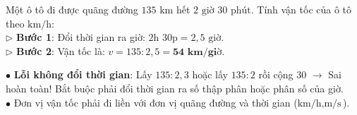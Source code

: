 \documentclass[14pt,a4paper,oneside]{extbook}
\begin{document}
\vspace{3mm}

\noindent
\begin{minipage}[t]{0.54\textwidth}
  \begin{tcolorbox}[
    enhanced,
    title={\footnotesize\bfseries\color{white}\faBolt\ Ví dụ tính vận tốc chuẩn},
    colback=green!3!white,
    colframe=green!60!black,
    arc=2.5mm, boxrule=0.8pt, top=1.8mm, bottom=1.8mm, left=2.2mm, right=2.2mm
  ]
    \footnotesize
    Một ô tô đi được quãng đường $135\text{ km}$ hết $2\text{ giờ } 30\text{ phút}$. Tính vận tốc của ô tô theo $\text{km/h}$:\\
    $\triangleright$ \textbf{Bước 1}: Đổi thời gian ra giờ: $2\text{h } 30\text{p} = 2,5\text{ giờ}$.\\
    $\triangleright$ \textbf{Bước 2}: Vận tốc là: $v = 135 : 2,5 = \mathbf{54\text{ km/giờ}}$.
  \end{tcolorbox}
\end{minipage}%
\hfill
\begin{minipage}[t]{0.44\textwidth}
  \begin{tcolorbox}[
    enhanced,
    title={\footnotesize\bfseries\color{white}\faExclamationTriangle\ Mẹo tránh bẫy trắc nghiệm},
    colback=red!2!white,
    colframe=red!70!black,
    arc=2.5mm, boxrule=0.8pt, top=1.8mm, bottom=1.8mm, left=2.2mm, right=2.2mm
  ]
    \footnotesize
    $\bullet$ \textbf{Lỗi không đổi thời gian}: Lấy $135 : 2,3$ hoặc lấy $135 : 2$ rồi cộng $30$ $\rightarrow$ Sai hoàn toàn! Bắt buộc phải đổi thời gian ra số thập phân hoặc phân số của giờ.\\
    $\bullet$ Đơn vị vận tốc phải đi liền với đơn vị quãng đường và thời gian ($\text{km/h}, \text{m/s}$).
  \end{tcolorbox}
\end{minipage}
\end{document}
